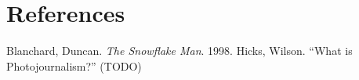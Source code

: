 \section{References}

\bibent Blanchard, Duncan. \textit{The Snowflake Man}. 1998.
\bibent Hicks, Wilson. ``What is Photojournalism?'' (TODO)
